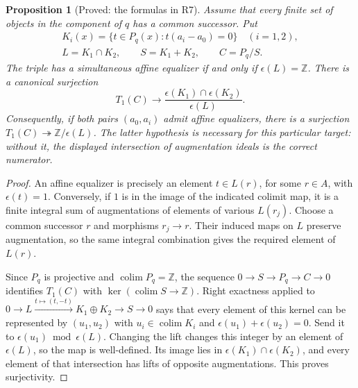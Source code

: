 \documentclass[11pt,a4paper]{article}
\newtheorem{proposition}[theorem]{Proposition}
\theoremstyle{definition}
\begin{document}
\begin{proposition}[Proved: the formulas in R7]\label{B:R7}
Assume that every finite set of objects in the component of $q$ has a
common successor.  Put
\[
\begin{gathered}
 K_i(x)=\{t\in P_q(x):t(a_i-a_0)=0\}\quad(i=1,2),\\
 L=K_1\cap K_2,\qquad S=K_1+K_2,\qquad C=P_q/S.
\end{gathered}
\]
The triple has a simultaneous affine equalizer if and only if
$\epsilon(L)=\mathbb Z$.  There is a canonical surjection
\[
 T_1(C)\longrightarrow
 \frac{\epsilon(K_1)\cap\epsilon(K_2)}{\epsilon(L)}.
\]
Consequently, if both pairs $(a_0,a_i)$ admit affine equalizers, there is
 a surjection $T_1(C)\twoheadrightarrow\mathbb Z/\epsilon(L)$.
The latter hypothesis is necessary for this particular target: without
it, the displayed intersection of augmentation ideals is the correct
numerator.
\end{proposition}
\begin{proof}
An affine equalizer is precisely an element $t\in L(r)$, for some
$r\in A$, with $\epsilon(t)=1$.  Conversely, if $1$ is in the image of
the indicated colimit map, it is a finite integral sum of augmentations
of elements of various $L(r_j)$.  Choose a common successor $r$ and
morphisms $r_j\to r$.  Their induced maps on $L$ preserve augmentation,
so the same integral combination gives the required element of $L(r)$.

Since $P_q$ is projective and $\operatorname{colim}P_q=\mathbb Z$, the
sequence $0\to S\to P_q\to C\to0$ identifies $T_1(C)$ with
$\ker(\operatorname{colim}S\to\mathbb Z)$.  Right exactness applied to
$0\to L\xrightarrow{t\mapsto(t,-t)}K_1\oplus K_2\to S\to0$ says that
every element of this kernel can be represented by $(u_1,u_2)$ with
$u_i\in\operatorname{colim}K_i$ and
$\epsilon(u_1)+\epsilon(u_2)=0$.  Send it to
$\epsilon(u_1)\bmod\epsilon(L)$.  Changing the lift changes this integer
by an element of $\epsilon(L)$, so the map is well-defined.  Its image
lies in $\epsilon(K_1)\cap\epsilon(K_2)$, and every element of that
intersection has lifts of opposite augmentations.  This proves
surjectivity.
\end{proof}
\end{document}
